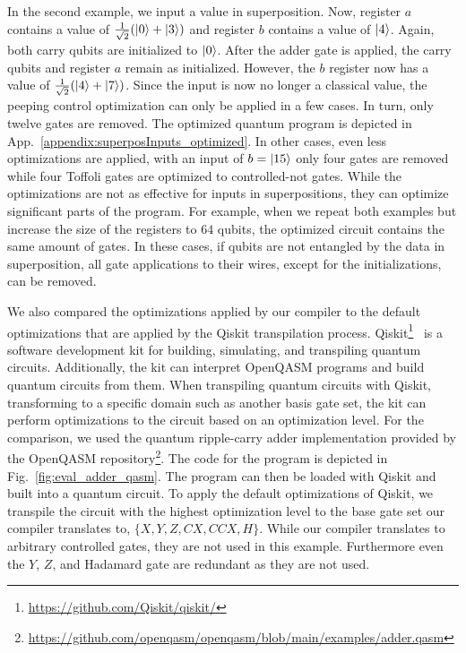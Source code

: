 In the second example, we input a value in superposition. Now, register $a$ contains a value of $\frac{1}{\sqrt{2}} (\ket{0} + \ket{3})$ and register $b$ contains a value of $\ket{4}$. Again, both carry qubits are initialized to $\ket{0}$. After the adder gate is applied, the carry qubits and register $a$ remain as initialized. However, the $b$ register now has a value of $\frac{1}{\sqrt{2}} (\ket{4} + \ket{7})$.
Since the input is now no longer a classical value, the peeping control optimization can only be applied in a few cases. In turn, only twelve gates are removed. The optimized quantum program is depicted in App.~\ref{appendix:superposInputs_optimized}. In other cases, even less optimizations are applied, \eg with an input of $b = \ket{15}$ only four gates are removed while four Toffoli gates are optimized to controlled-not gates.
While the optimizations are not as effective for inputs in superpositions, they can optimize significant parts of the program. For example, when we repeat both examples but increase the size of the registers to $64$ qubits, the optimized circuit contains the same amount of gates. In these cases, if qubits are not entangled by the data in superposition, all gate applications to their wires, except for the initializations, can be removed.

We also compared the optimizations applied by our compiler to the default optimizations that are applied by the Qiskit transpilation process. Qiskit\footnote{\url{https://github.com/Qiskit/qiskit/}}~\cite{JTK*24} is a software development kit for building, simulating, and transpiling quantum circuits. Additionally, the kit can interpret OpenQASM programs and build quantum circuits from them. When transpiling quantum circuits with Qiskit, \ie transforming to a specific domain such as another basis gate set, the kit can perform optimizations to the circuit based on an optimization level. For the comparison, we used the quantum ripple-carry adder implementation provided by the OpenQASM repository\footnote{\url{https://github.com/openqasm/openqasm/blob/main/examples/adder.qasm}}. The code for the program is depicted in Fig.~\ref{fig:eval_adder_qasm}. The program can then be loaded with Qiskit and built into a quantum circuit. To apply the default optimizations of Qiskit, we transpile the circuit with the highest optimization level to the base gate set our compiler translates to, \ie $\{X, Y, Z, CX, CCX, H\}$. While our compiler translates to arbitrary controlled gates, they are not used in this example. Furthermore even the $Y$, $Z$, and Hadamard gate are redundant as they are not used.

